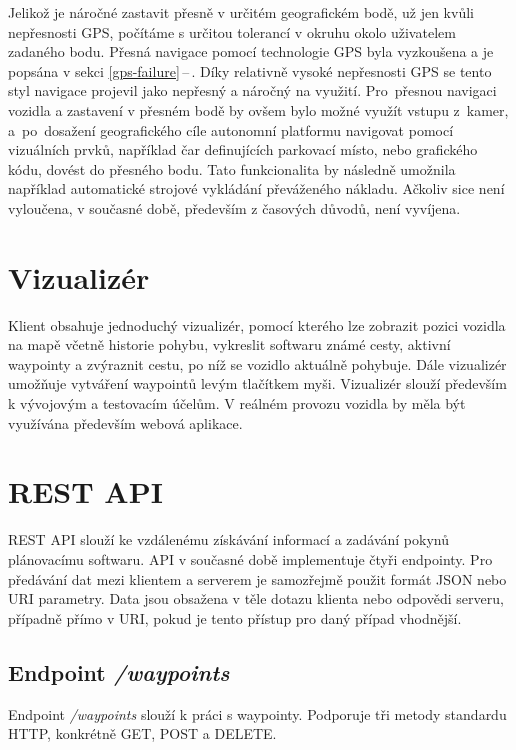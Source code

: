 \documentclass[czech, bachelor]{diploma}
\newcommand{\filipref}[1]{\ref{#1}\,--\,\nameref{#1}}
\begin{document}
Jelikož je náročné zastavit přesně v určitém geografickém bodě, už jen kvůli nepřesnosti GPS, počítáme s určitou tolerancí
v okruhu okolo uživatelem zadaného bodu. Přesná navigace pomocí technologie GPS byla vyzkoušena a je popsána v sekci
\filipref{gps-failure}. Díky relativně vysoké nepřesnosti GPS se tento styl navigace projevil jako nepřesný a náročný na využití.
Pro~přesnou navigaci vozidla a zastavení v přesném bodě by ovšem bylo možné využít vstupu z~kamer, a~po~dosažení geografického
cíle autonomní platformu navigovat pomocí vizuálních prvků, například čar definujících parkovací místo, nebo grafického kódu,
dovést do přesného bodu. Tato funkcionalita by následně umožnila například automatické strojové vykládání převáženého nákladu.
Ačkoliv sice není vyloučena, v současné době, především z časových důvodů, není vyvíjena.

\section{Vizualizér} \label{visualizer}

Klient obsahuje jednoduchý vizualizér, pomocí kterého lze zobrazit pozici vozidla na mapě včetně historie pohybu, vykreslit
softwaru známé cesty, aktivní waypointy a zvýraznit cestu, po níž se vozidlo aktuálně pohybuje. Dále vizualizér umožňuje vytváření
waypointů levým tlačítkem myši. Vizualizér slouží především k vývojovým a testovacím účelům. V reálném provozu vozidla by měla
být využívána především webová aplikace.

\section{REST API} \label{rest-api}

REST API slouží ke vzdálenému získávání informací a zadávání pokynů plánovacímu softwaru. API v současné době implementuje čtyři
endpointy. Pro předávání dat mezi klientem a serverem je samozřejmě použit formát JSON nebo URI parametry. Data jsou obsažena
v těle dotazu klienta nebo odpovědi serveru, případně přímo v URI, pokud je tento přístup pro daný případ vhodnější.

\subsection{Endpoint \emph{/waypoints}}

Endpoint \emph{/waypoints} slouží k práci s waypointy. Podporuje tři metody standardu HTTP, konkrétně GET, POST a DELETE.
\end{document}
